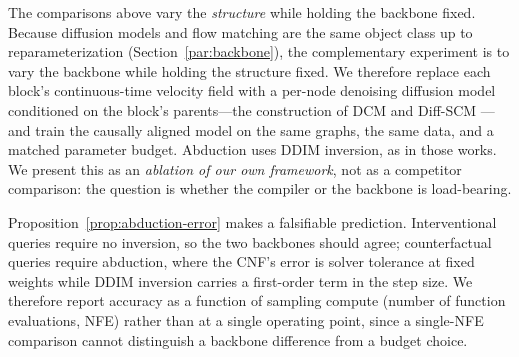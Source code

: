 The comparisons above vary the \emph{structure} while holding the backbone fixed. Because
diffusion models and flow matching are the same object class up to reparameterization
(Section~\ref{par:backbone}), the complementary experiment is to vary the backbone while
holding the structure fixed. We therefore replace each block's continuous-time velocity field
with a per-node denoising diffusion model conditioned on the block's parents---the
construction of DCM \citep{chao2023interventional} and Diff-SCM
\citep{sanchez2022diffusion}---and train the causally aligned model on the same graphs, the same data,
and a matched parameter budget. Abduction uses DDIM inversion, as in those works. We present
this as an \emph{ablation of our own framework}, not as a competitor comparison: the question
is whether the compiler or the backbone is load-bearing.

Proposition~\ref{prop:abduction-error} makes a falsifiable prediction. Interventional queries
require no inversion, so the two backbones should agree; counterfactual queries require
abduction, where the CNF's error is solver tolerance at fixed weights while DDIM inversion
carries a first-order term in the step size. We therefore report accuracy as a function of
sampling compute (number of function evaluations, NFE) rather than at a single operating
point, since a single-NFE comparison cannot distinguish a backbone difference from a budget
choice.

